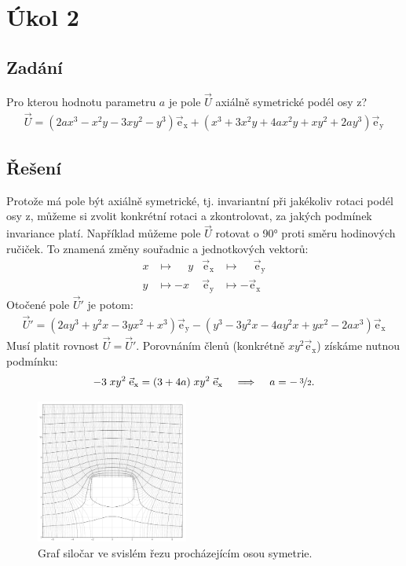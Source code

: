 \documentclass[10pt,a4paper]{article}
\def\ph{\phantom}
\newcommand{\const}[1]{\text{#1}}
\begin{document}
\section*{Úkol 2}

\subsection*{Zadání}
Pro kterou hodnotu parametru $a$ je pole $\vec{U}$ axiálně symetrické podél osy $\const{z}$?
\begin{gather*}
    \vec{U}
    = \left( 2ax^3 - x^2y - 3xy^2 - y^3 \right) \vec{\const{e}}_\const{x}
    + \left( x^3 + 3x^2 y + 4ax^2 y + xy^2 + 2ay^3 \right) \vec{\const{e}}_\const{y}
\end{gather*}

\subsection*{Řešení}
Protože má pole být axiálně symetrické, tj. invariantní při jakékoliv rotaci podél osy $\const{z}$, můžeme si zvolit konkrétní rotaci a zkontrolovat, za jakých podmínek invariance platí. Například můžeme pole $\vec{U}$ rotovat o 90° proti směru hodinových ručiček. To znamená změny souřadnic a jednotkových vektorů:
\begin{align*}
    x &\mapsto \ph{-} y &
    \vec{\const{e}}_\const{x} &\mapsto \ph{-} \vec{\const{e}}_\const{y} \\
    y &\mapsto -x &
    \vec{\const{e}}_\const{y} &\mapsto -\vec{\const{e}}_\const{x}
\end{align*}
Otočené pole $\vec{U}'$ je potom:
\begin{gather*}
    \vec{U}'
    = \left( 2ay^3 + y^2x - 3yx^2 + x^3 \right) \vec{\const{e}}_\const{y}
    - \left( y^3 - 3y^2 x - 4ay^2 x + yx^2 - 2ax^3 \right) \vec{\const{e}}_\const{x}
\end{gather*}
Musí platit rovnost $\vec{U} = \vec{U}'$. Porovnáním členů (konkrétně $xy^2\vec{\const{e}}_\const{x}$) získáme nutnou podmínku:
\begin{align*}
    -3\; xy^2 \; \vec{\const{e}}_\const{x}
    = (3+4a) \; xy^2 \; \vec{\const{e}}_\const{x}
    \;\;\; \implies \;\;\;
    a = - \, \nicefrac{3}{2}.
\end{align*}


\pagebreak
\begin{figure}
    \centering
    \includegraphics[width=5cm]{uloha3_zadani.pdf}
    \caption{Graf siločar ve svislém řezu procházejícím osou symetrie.}
\end{figure}
\end{document}
